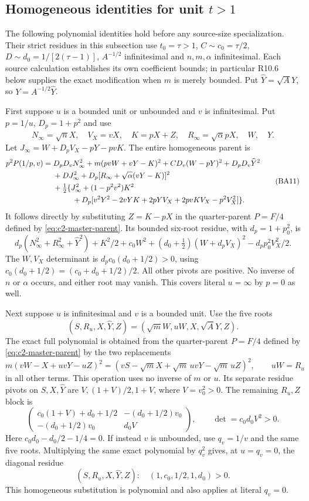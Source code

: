 \subsection{Homogeneous identities for unit $t>1$}
The following polynomial identities hold before any source-size
specialization. Their strict residues in this subsection use
$t_0=\tau>1$, $C\sim c_0=\tau/2$, $D\sim d_0=1/[2(\tau-1)]$,
$A^{-1/2}$ infinitesimal and $n,m,\alpha$ infinitesimal. Each source
calculation establishes its own coefficient bounds; in particular R10.6
below supplies the exact modification when $m$ is merely bounded.
Put $\widehat Y=\sqrt A Y$, so $Y=A^{-1/2}\widehat Y$.

First suppose $u$ is a bounded unit or unbounded and $v$ is
infinitesimal. Put $p=1/u$, $D_p=1+p^2$ and use
\[
 N_\infty=\sqrt n X,\quad V_X=vX,\quad K=pX+Z,\quad
 R_\infty=\sqrt\alpha pX,\quad W,\quad\widehat Y.
\]
Let $J_\infty=W+D_pV_X-pY-pvK$. The entire homogeneous parent is
\[
 \begin{split}
 p^2P(1/p,v)={}&D_pD_vN_\infty^2+m(pvW+vY-K)^2
 +CD_v(W-pY)^2+D_pD_v\widehat Y^2\\
 &+DJ_\infty^2+D_p[R_\infty+\sqrt\alpha(vY-K)]^2\\
 &+\tfrac12\{J_\infty^2+(1-p^2v^2)K^2\\
 &\hspace{9mm}+D_p[v^2Y^2-2vYK+2pYV_X+2pvKV_X-p^2V_X^2]\}.
 \end{split}                                                       \tag{BA11}
\]
It follows directly by substituting $Z=K-pX$ in the quarter-parent $P=F/4$ defined by \eqref{eq:c2-master-parent}. Its bounded
six-root residue, with $d_p=1+p_0^2$, is
\[
 d_p(N_\infty^2+R_\infty^2+\widehat Y^2)+K^2/2
 +c_0W^2+(d_0+\tfrac12)(W+d_pV_X)^2-d_pp_0^2V_X^2/2.
\]
The $W,V_X$ determinant is $d_pc_0(d_0+1/2)>0$, using
$c_0(d_0+1/2)=(c_0+d_0+1/2)/2$. All other pivots are positive.
No inverse of $n$ or $\alpha$ occurs, and either root may vanish.
This covers literal $u=\infty$ by $p=0$ as well.

Next suppose $u$ is infinitesimal and $v$ is a bounded unit.
Use the five roots
\[
 (S,R_u,X,\widehat Y,Z)=(\sqrt mW,uW,X,\sqrt A Y,Z).
\]
The exact full polynomial is obtained from the quarter-parent $P=F/4$ defined by \eqref{eq:c2-master-parent} by the two replacements
\[
 m(vW-X+uvY-uZ)^2=(vS-\sqrt mX+\sqrt m\,uvY-\sqrt m\,uZ)^2,
 \qquad uW=R_u
\]
in all other terms. This operation uses no inverse of $m$ or $u$.
Its separate residue pivots on $S,X,\widehat Y$ are
$V,(1+V)/2,1+V$, where $V=v_0^2>0$. The remaining $R_u,Z$ block is
\[
 \begin{pmatrix}
 c_0(1+V)+d_0+1/2&-(d_0+1/2)v_0\\
 -(d_0+1/2)v_0&d_0V
 \end{pmatrix},\qquad \det=c_0d_0V^2>0.             \tag{BA12}
\]
Here $c_0d_0-d_0/2-1/4=0$. If instead $v$ is unbounded, use
$q_v=1/v$ and the same five roots. Multiplying the same exact
polynomial by $q_v^2$ gives, at $u=q_v=0$, the diagonal residue
\[
 (S,R_u,X,\widehat Y,Z):\quad (1,c_0,1/2,1,d_0)>0.   \tag{BA13}
\]
This homogeneous substitution is polynomial and also applies at
literal $q_v=0$.

